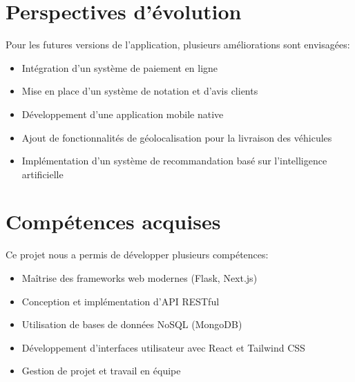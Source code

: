 \documentclass[12pt,a4paper]{report}
\begin{document}
\section{Perspectives d'évolution}
Pour les futures versions de l'application, plusieurs améliorations sont envisagées:
\begin{itemize}
    \item Intégration d'un système de paiement en ligne
    \item Mise en place d'un système de notation et d'avis clients
    \item Développement d'une application mobile native
    \item Ajout de fonctionnalités de géolocalisation pour la livraison des véhicules
    \item Implémentation d'un système de recommandation basé sur l'intelligence artificielle
\end{itemize}

\section{Compétences acquises}
Ce projet nous a permis de développer plusieurs compétences:
\begin{itemize}
    \item Maîtrise des frameworks web modernes (Flask, Next.js)
    \item Conception et implémentation d'API RESTful
    \item Utilisation de bases de données NoSQL (MongoDB)
    \item Développement d'interfaces utilisateur avec React et Tailwind CSS
    \item Gestion de projet et travail en équipe
\end{itemize}
\end{document}
